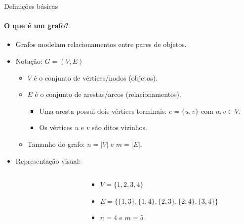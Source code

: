 \begin{frame}{Definições básicas}
	\framesubtitle{O que é um grafo?}
	
	\begin{itemize}
		\item Grafos modelam relacionamentos entre pares de objetos.
		\item {\color{magenta}Notação:} $G = (V, E)$
		\begin{itemize}
			\item $V$ é o conjunto de vértices/nodos (objetos).
			\item $E$ é o conjunto de arestas/arcos (relacionamentos).
			\begin{itemize}
				\item Uma aresta possui dois vértices terminais: $e = \{u, v\}$ com $u, v \in V$.
				\item Os vértices $u$ e $v$ são ditos vizinhos.
			\end{itemize}
			\item Tamanho do grafo: $n = |V|$ e $m = |E|$.
		\end{itemize}
		
		\pause
		\item {\color{magenta}Representação visual:}
	\end{itemize}
	
	\vspace{-12pt}

	\begin{columns}
		\begin{column}{0.35\textwidth}
		\begin{figure}		
			
		\end{figure}
		\end{column}
		\begin{column}{0.65\textwidth}
			\begin{itemize}
				\item $V = \{1, 2, 3, 4\}$
				\item $E = \{\{1, 3\}, \{1, 4\}, \{2, 3\}, \{2, 4\}, \{3, 4\}\}$
				\item $n = 4$ e $m = 5$
			\end{itemize}
		\end{column}
	\end{columns}
\end{frame}



